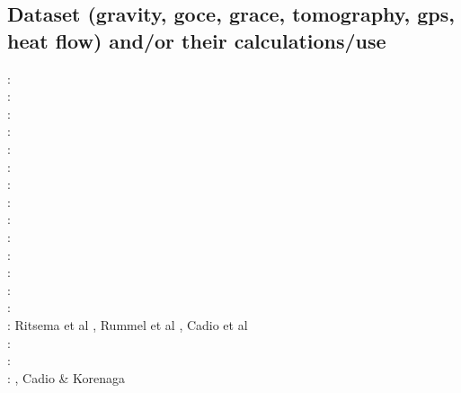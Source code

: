 \subsection{Dataset (gravity, goce, grace, tomography, gps, heat flow) 
and/or their calculations/use}

\begin{scriptsize}
\nineteenseventyseven: \cite{rola77}\\
\nineteeneightyone: \cite{dzan81}\\
\nineteenninety: \cite{lips90}\\
\nineteenninetyone: \cite{spak91}\\
\nineteenninetythree: \cite{kara93}\\
\nineteenninetyeight: \cite{bisp98}\\
\twothousandone: \cite{buda01}\\
\twothousandtwo: \cite{bebo02}\\
\twothousandthree: \cite{krhh03}\cite{sosi03}\cite{pimo03}\cite{sosi03}\\
\twothousandsix: \cite{masr06}\cite{arte06}\\
\twothousandseven: \cite{mitk07}\cite{lobc07}\cite{rimb07}\\
\twothousandeight: \cite{zhou08}\cite{zhou08}\cite{roma08}\cite{tekc08}\\
\twothousandnine: \cite{scbr09}\\
\twothousandten: \cite{dada10}\cite{sifb10}\cite{katc10}\\
\twothousandeleven: Ritsema et al \cite{ridv11}, Rummel et al \cite{ruys11}, Cadio et al \cite{capd11}\\
\twothousandtwelve: \cite{hawj12}\cite{resa12}\cite{hawj12}\cite{fesw12}\cite{simj12}\cite{beck12}\cite{pahk12}\\
\twothousandthirteen: \cite{ress13}\cite{ebbf13}\cite{davi13}\cite{scle13}\cite{waja13}\\
\twothousandfourteen: \cite{paml14}\cite{ebbf14}\cite{krbk14}\cite{licl14}\cite{aubb14}, 
Cadio \& Korenaga \cite{cako14}\\

\end{scriptsize}
